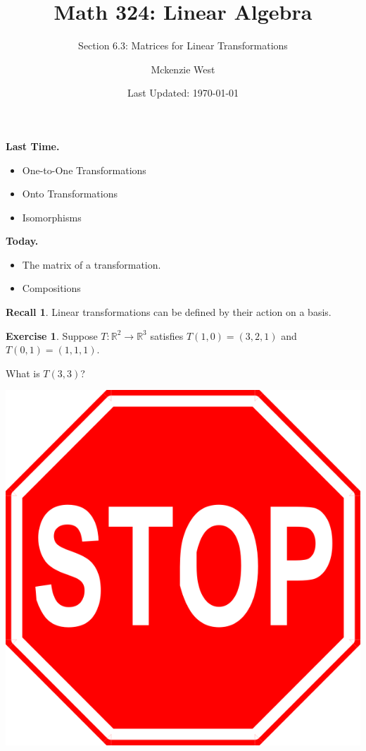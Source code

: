 \documentclass{beamer}
\newcommand{\R}{\mathbb{R}}
\newcommand{\fn}{\insertframenumber}
\theoremstyle{definition}
\newtheorem{exercise}{Exercise}
\newtheorem*{recall}{Recall}
\begin{document}
	\title{Math 324: Linear Algebra}
	\subtitle{Section 6.3: Matrices for Linear Transformations}
	\author{Mckenzie West}
	\date{Last Updated: \today}
\begin{frame}[fragile]
\maketitle	
\end{frame}

\begin{frame}{\insertframenumber}
	\begin{block}{\textbf{Last Time.}}
	\begin{itemize}[label=--]
		\item One-to-One Transformations
		\item Onto Transformations
		\item Isomorphisms
	\end{itemize}
	\end{block}
	\begin{block}{\textbf{Today.}}
		\begin{itemize}[label=--]
			\item The matrix of a transformation.
			\item Compositions
		\end{itemize}
	\end{block}
\end{frame}
\begin{frame}{\fn}
	\begin{recall}
		Linear transformations can be defined by their action on a basis.
	\end{recall}
	\begin{exercise}
		Suppose $T:\R^2\to\R^3$ satisfies $T(1,0)=(3,2,1)$ and $T(0,1)=(1,1,1)$.
		
		What is $T(3,3)$?
	\end{exercise}
	\begin{center}
		\includegraphics[width=.5in]{images/stop}
	\end{center}
\end{frame}
\end{document}

